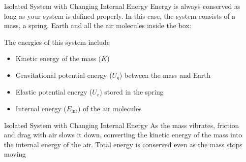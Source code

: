 \documentclass[12pt,compress,aspectratio=169]{beamer}
\begin{document}
\begin{frame}{Isolated System with Changing Internal Energy}
  Energy is always conserved as long as your system is defined properly. In
  this case, the system consists of a mass, a spring, Earth and all the air
  molecules inside the box:
  \begin{center}
  \end{center}
  The energies of this system include
  \begin{itemize}
  \item Kinetic energy of the mass ($K$)
  \item Gravitational potential energy ($U_g$) between the mass and Earth
  \item Elastic potential energy ($U_e$) stored in the spring
  \item Internal energy ($E_\text{int}$) of the air molecules
  \end{itemize}
\end{frame}



\begin{frame}{Isolated System with Changing Internal Energy}
  As the mass vibrates, friction and drag with air slows it down, converting the
  kinetic energy of the mass into the internal energy of the air. Total energy
  is conserved even as the mass stops moving

  \vspace{.2in}
  \begin{columns}
    \centering

  \end{columns}
%
\end{frame}
\end{document}

